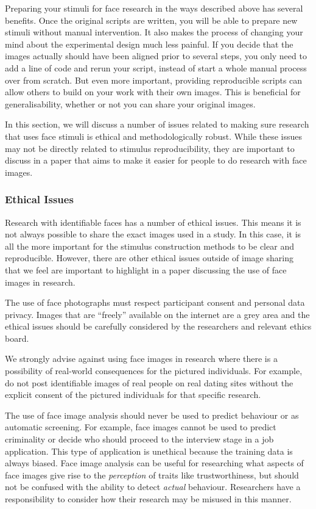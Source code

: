 \documentclass[
  doc,floatsintext]{apa6}
\begin{document}
Preparing your stimuli for face research in the ways described above has several benefits. Once the original scripts are written, you will be able to prepare new stimuli without manual intervention. It also makes the process of changing your mind about the experimental design much less painful. If you decide that the images actually should have been aligned prior to several steps, you only need to add a line of code and rerun your script, instead of start a whole manual process over from scratch. But even more important, providing reproducible scripts can allow others to build on your work with their own images. This is beneficial for generalisability, whether or not you can share your original images.

In this section, we will discuss a number of issues related to making sure research that uses face stimuli is ethical and methodologically robust. While these issues may not be directly related to stimulus reproducibility, they are important to discuss in a paper that aims to make it easier for people to do research with face images.

\hypertarget{ethical-issues}{%
\subsubsection{Ethical Issues}\label{ethical-issues}}

Research with identifiable faces has a number of ethical issues. This means it is not always possible to share the exact images used in a study. In this case, it is all the more important for the stimulus construction methods to be clear and reproducible. However, there are other ethical issues outside of image sharing that we feel are important to highlight in a paper discussing the use of face images in research.

The use of face photographs must respect participant consent and personal data privacy. Images that are ``freely'' available on the internet are a grey area and the ethical issues should be carefully considered by the researchers and relevant ethics board.

We strongly advise against using face images in research where there is a possibility of real-world consequences for the pictured individuals. For example, do not post identifiable images of real people on real dating sites without the explicit consent of the pictured individuals for that specific research.

The use of face image analysis should never be used to predict behaviour or as automatic screening. For example, face images cannot be used to predict criminality or decide who should proceed to the interview stage in a job application. This type of application is unethical because the training data is always biased. Face image analysis can be useful for researching what aspects of face images give rise to the \emph{perception} of traits like trustworthiness, but should not be confused with the ability to detect \emph{actual} behaviour. Researchers have a responsibility to consider how their research may be misused in this manner.
\end{document}
